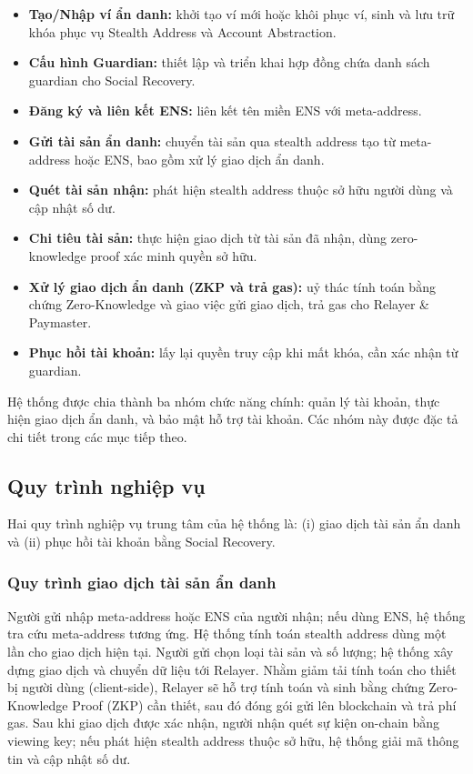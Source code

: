 \documentclass[../DoAn.tex]{subfiles}
\begin{document}
\begin{itemize}
    \item \textbf{Tạo/Nhập ví ẩn danh:} khởi tạo ví mới hoặc khôi phục ví, sinh và lưu trữ khóa phục vụ Stealth Address và Account Abstraction.
    \item \textbf{Cấu hình Guardian:} thiết lập và triển khai hợp đồng chứa danh sách guardian cho Social Recovery.
    \item \textbf{Đăng ký và liên kết ENS:} liên kết tên miền ENS với meta-address.
    \item \textbf{Gửi tài sản ẩn danh:} chuyển tài sản qua stealth address tạo từ meta-address hoặc ENS, bao gồm xử lý giao dịch ẩn danh.
    \item \textbf{Quét tài sản nhận:} phát hiện stealth address thuộc sở hữu người dùng và cập nhật số dư.
    \item \textbf{Chi tiêu tài sản:} thực hiện giao dịch từ tài sản đã nhận, dùng zero-knowledge proof xác minh quyền sở hữu.
    \item \textbf{Xử lý giao dịch ẩn danh (ZKP và trả gas):} uỷ thác tính toán bằng chứng Zero-Knowledge và giao việc gửi giao dịch, trả gas cho Relayer \& Paymaster.
    \item \textbf{Phục hồi tài khoản:} lấy lại quyền truy cập khi mất khóa, cần xác nhận từ guardian.
\end{itemize}

Hệ thống được chia thành ba nhóm chức năng chính: quản lý tài khoản, thực hiện giao dịch ẩn danh, và bảo mật hỗ trợ tài khoản. Các nhóm này được đặc tả chi tiết trong các mục tiếp theo.

\subsection{Quy trình nghiệp vụ}
\label{subsection:2.2.3}

Hai quy trình nghiệp vụ trung tâm của hệ thống là: (i) giao dịch tài sản ẩn danh và (ii) phục hồi tài khoản bằng Social Recovery.

\subsubsection{Quy trình giao dịch tài sản ẩn danh}

Người gửi nhập meta-address hoặc ENS của người nhận; nếu dùng ENS, hệ thống tra cứu meta-address tương ứng. Hệ thống tính toán stealth address dùng một lần cho giao dịch hiện tại. Người gửi chọn loại tài sản và số lượng; hệ thống xây dựng giao dịch và chuyển dữ liệu tới Relayer. Nhằm giảm tải tính toán cho thiết bị người dùng (client-side), Relayer sẽ hỗ trợ tính toán và sinh bằng chứng Zero-Knowledge Proof (ZKP) cần thiết, sau đó đóng gói gửi lên blockchain và trả phí gas. Sau khi giao dịch được xác nhận, người nhận quét sự kiện on-chain bằng viewing key; nếu phát hiện stealth address thuộc sở hữu, hệ thống giải mã thông tin và cập nhật số dư.
\end{document}
